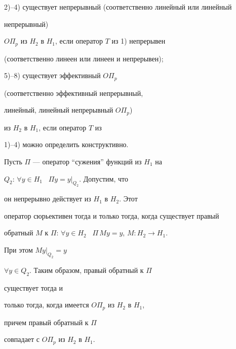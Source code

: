 

















2)--4) существует непрерывный (соответственно линейный или линейный


непрерывный)


$O\Pi_p$ из $H_2$ в $H_1$, если оператор $T$ из 1) непрерывен


(соответственно линеен или линеен и непрерывен);





5)--8) существует эффективный $O\Pi_p$


(соответственно эффективный непрерывный,


линейный, линейный непрерывный $O\Pi_p$)


из $H_2$ в $H_1$, если оператор $T$ из


1)--4) можно определить конструктивно.





Пусть $\Pi$ --- оператор ``сужения'' функций из $H_1$ на


$Q_2$: $\forall y\in H_1$ \ $\Pi y=y|_{Q_2}$. Допустим, что


он непрерывно действует из $H_1$ в $H_2$. Этот


оператор сюрьективен тогда и только тогда, когда существует правый


обратный $M$ к $\Pi$: $\forall y\in H_2$ \ $\Pi\,My=y$, $M: H_2\to H_1$.


При этом $My|_{Q_2}=y$


$\forall y\in Q_2$. Таким образом, правый обратный к $\Pi$


существует тогда и


только тогда, когда имеется $O\Pi_p$ из $H_2$ в $H_1$,


причем правый обратный к $\Pi$


совпадает с $O\Pi_p$ из $H_2$ в $H_1$.





